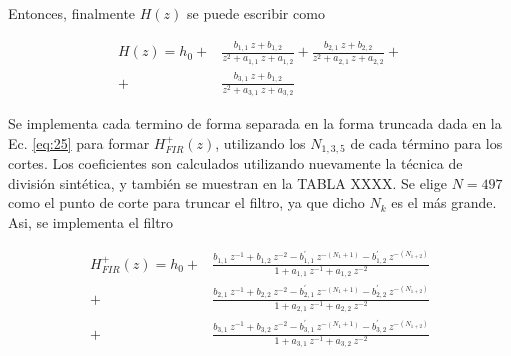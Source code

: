 \message{ !name(../main.tex)}\documentclass[journal,transmag]{IEEEtran}
\begin{document}
     Entonces, finalmente $H(z)$ se puede escribir como

     \begin{equation}
       \begin{aligned}
       H(z) = h_{0} +& \frac{b_{1,1} \: z + b_{1,2}}{z^{2} + a_{1,1} \: z + a_{1,2}} +
       \frac{b_{2,1} \: z + b_{2,2}}{z^{2} + a_{2,1} \: z + a_{2,2}} + \\
       +& \frac{b_{3,1} \: z + b_{1,2}}{z^{2} + a_{3,1} \: z + a_{3,2}}
       \end{aligned}
     \end{equation}

     Se implementa cada termino de forma separada en la forma truncada dada en la
     Ec. \ref{eq:25} para formar $H_{FIR}^{+}(z)$, utilizando los $N_{1,3,5}$ de
     cada término para los cortes. Los coeficientes son calculados utilizando
     nuevamente la técnica de división sintética, y también se muestran en la
     TABLA XXXX. Se elige $N = 497$ como el punto de corte para truncar el
     filtro, ya que dicho $N_{k}$ es el más grande. Asi, se implementa el filtro

     \begin{widetext}
     \begin{equation}
      \begin{aligned}
        H_{FIR}^{+}(z) = h_{0} +&
        \frac{b_{1,1} \: z^{-1} + b_{1,2} \: z^{-2} - b_{1,1}^{\prime} \: z^{-(N_{1}+1)} - b_{1,2}^{\prime} \: z^{-(N_{1+2})}}{1 + a_{1,1} \: z^{-1} + a_{1,2} \: z^{-2}} \\
        +& \frac{b_{2,1} \: z^{-1} + b_{2,2} \: z^{-2} - b_{2,1}^{\prime} \: z^{-(N_{1}+1)} - b_{2,2}^{\prime} \: z^{-(N_{1+2})}}{1 + a_{2,1} \: z^{-1} + a_{2,2} \: z^{-2}} \\
        +& \frac{b_{3,1} \: z^{-1} + b_{3,2} \: z^{-2} - b_{3,1}^{\prime} \: z^{-(N_{1}+1)} - b_{3,2}^{\prime} \: z^{-(N_{1+2})}}{1 + a_{3,1} \: z^{-1} + a_{3,2} \: z^{-2}}
      \end{aligned}
     \end{equation}
     \end{widetext}


\end{document}
